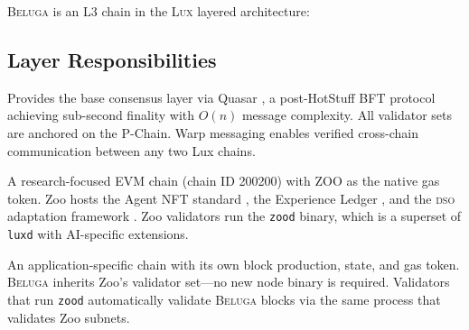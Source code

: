 \documentclass[11pt,letterpaper]{article}
\newcommand{\Zoo}{\textsc{Zoo}}
\newcommand{\Lux}{\textsc{Lux}}
\newcommand{\Beluga}{\textsc{Beluga}}
\newcommand{\DSO}{\textsc{dso}}
\begin{document}
\Beluga{} is an L3 chain in the \Lux{} layered architecture:

\begin{center}
\end{center}

\subsection{Layer Responsibilities}

\begin{description}[leftmargin=2cm, style=nextline]
    \item[Lux (L0)] Provides the base consensus layer via Quasar \cite{lux-quasar}, a post-HotStuff BFT protocol achieving sub-second finality with $O(n)$ message complexity. All validator sets are anchored on the P-Chain. Warp messaging enables verified cross-chain communication between any two Lux chains.
    \item[Zoo (L2)] A research-focused EVM chain (chain ID 200200) with ZOO as the native gas token. Zoo hosts the Agent NFT standard \cite{zoo-agent-nft}, the Experience Ledger \cite{zoo-experience-ledger}, and the \DSO{} adaptation framework \cite{zoo-dso}. Zoo validators run the \texttt{zood} binary, which is a superset of \texttt{luxd} with AI-specific extensions.
    \item[Beluga (L3)] An application-specific chain with its own block production, state, and gas token. \Beluga{} inherits Zoo's validator set---no new node binary is required. Validators that run \texttt{zood} automatically validate \Beluga{} blocks via the same process that validates Zoo subnets.
\end{description}
\end{document}
